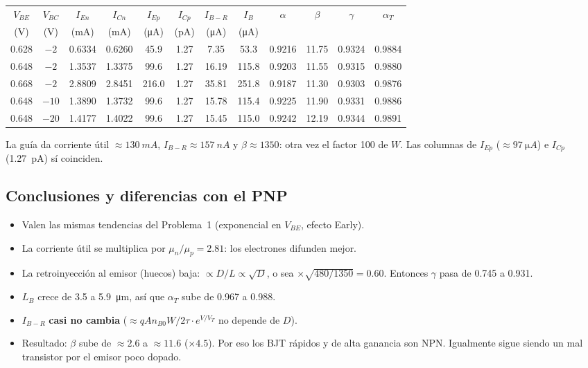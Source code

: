 \documentclass[11pt,a4paper]{article}
\newcommand{\aT}{\alpha_T}
\begin{document}
\begin{clave}
\centering\small
\setlength{\tabcolsep}{3.5pt}
\begin{tabular}{cccccccccccc}
\toprule
$V_{BE}$ & $V_{BC}$ & $I_{En}$ & $I_{Cn}$ & $I_{Ep}$ & $I_{Cp}$ & $I_{B-R}$ & $I_B$ & $\alpha$ & $\beta$ & $\gamma$ & $\aT$\\
(V) & (V) & (mA) & (mA) & (\si{\micro A}) & (pA) & (\si{\micro A}) & (\si{\micro A}) & & & & \\
\midrule
0.628 & $-2$  & 0.6334 & 0.6260 & 45.9  & 1.27 & 7.35  & 53.3  & 0.9216 & 11.75 & 0.9324 & 0.9884\\
0.648 & $-2$  & 1.3537 & 1.3375 & 99.6  & 1.27 & 16.19 & 115.8 & 0.9203 & 11.55 & 0.9315 & 0.9880\\
0.668 & $-2$  & 2.8809 & 2.8451 & 216.0 & 1.27 & 35.81 & 251.8 & 0.9187 & 11.30 & 0.9303 & 0.9876\\
\midrule
0.648 & $-10$ & 1.3890 & 1.3732 & 99.6  & 1.27 & 15.78 & 115.4 & 0.9225 & 11.90 & 0.9331 & 0.9886\\
0.648 & $-20$ & 1.4177 & 1.4022 & 99.6  & 1.27 & 15.45 & 115.0 & 0.9242 & 12.19 & 0.9344 & 0.9891\\
\bottomrule
\end{tabular}
\end{clave}

\begin{ojo}
La guía da corriente útil $\approx\SI{130}{mA}$, $I_{B-R}\approx\SI{157}{nA}$ y $\beta\approx1350$:
otra vez el factor 100 de $W$. Las columnas de $I_{Ep}$ ($\approx\SI{97}{\micro A}$) e $I_{Cp}$
(\SI{1.27}{pA}) sí coinciden.
\end{ojo}

\subsection*{Conclusiones y diferencias con el PNP}
\begin{itemize}
  \item Valen las mismas tendencias del Problema~1 (exponencial en $V_{BE}$, efecto Early).
  \item La corriente útil se multiplica por $\mu_n/\mu_p=2.81$: los electrones difunden mejor.
  \item La retroinyección al emisor (huecos) baja: $\propto D/L\propto\sqrt{D}$, o sea
  $\times\sqrt{480/1350}=0.60$. Entonces $\gamma$ pasa de 0.745 a 0.931.
  \item $L_B$ crece de 3.5 a \SI{5.9}{\micro m}, así que $\aT$ sube de 0.967 a 0.988.
  \item $I_{B-R}$ \textbf{casi no cambia} ($\approx qAn_{B0}W/2\tau\cdot e^{V/V_T}$ no depende de $D$).
  \item Resultado: $\beta$ sube de $\approx2.6$ a $\approx11.6$ ($\times4.5$). Por eso los BJT
  rápidos y de alta ganancia son NPN. Igualmente sigue siendo un mal transistor por el emisor
  poco dopado.
\end{itemize}
\end{document}
